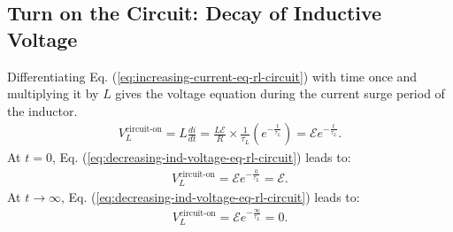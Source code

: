 \documentclass[12pt,b4paper]{article}
\begin{document}
\subsection{Turn on the Circuit: Decay of Inductive Voltage}
Differentiating Eq. (\ref{eq:increasing-current-eq-rl-circuit}) with time once and multiplying it by $L$ gives the voltage equation during the current surge period of the inductor.
\begin{align}
    V_L^\text{circuit-on}=L\frac{di}{dt}=\frac{L\mathcal{E}}{R}\times\frac{1}{\tau_L}\left(e^{\displaystyle-\frac{t}{\tau_L}}\right)=\mathcal{E}e^{\displaystyle-\frac{t}{\tau_L}}.\label{eq:decreasing-ind-voltage-eq-rl-circuit}
\end{align}
At $t=0$, Eq. (\ref{eq:decreasing-ind-voltage-eq-rl-circuit}) leads to:
\begin{align*}
    V_L^\text{circuit-on}=\mathcal{E}e^{\displaystyle-\frac{0}{\tau_L}}=\mathcal{E}.
\end{align*}
At $t\to\infty$, Eq. (\ref{eq:decreasing-ind-voltage-eq-rl-circuit}) leads to:
\begin{align*}
    V_L^\text{circuit-on}=\mathcal{E}e^{\displaystyle-\frac{\infty}{\tau_L}}=0.
\end{align*}
\end{document}
